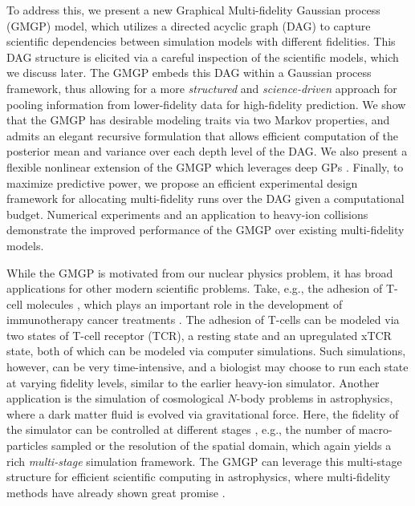 \documentclass[12pt]{article}
\begin{document}
To address this, we present a new Graphical Multi-fidelity Gaussian process (GMGP) model, which utilizes a directed acyclic graph (DAG) to capture scientific dependencies between simulation models with different fidelities. This DAG structure is elicited via a careful inspection of the scientific models, which we discuss later. The GMGP embeds this DAG within a Gaussian process framework, thus allowing for a more \textit{structured} and \textit{science-driven} approach for pooling information from lower-fidelity data for high-fidelity prediction. We show that the GMGP has desirable modeling traits via two Markov properties, and admits an elegant recursive formulation that allows efficient computation of the posterior mean and variance over each depth level of the DAG. {We also present a flexible nonlinear extension of the GMGP which leverages deep GPs \citep{DeepGP}. Finally, to maximize predictive power, we propose an efficient experimental design framework for allocating multi-fidelity runs over the DAG given a computational budget.
Numerical experiments and an application to heavy-ion collisions demonstrate the improved performance of the GMGP over existing multi-fidelity models. }

While the GMGP is motivated from our nuclear physics problem, it has broad applications for other modern scientific problems. Take, e.g., the adhesion of T-cell molecules \citep{sung2020calibration}, which plays an important role in the development of immunotherapy cancer treatments \citep{harjunpaa2019cell}. The adhesion of T-cells can be modeled via two states of T-cell receptor (TCR), a resting state and an upregulated xTCR state, both of which can be modeled via computer simulations. Such simulations, however, can be very time-intensive, and a biologist may choose to run each state at varying fidelity levels, similar to the earlier heavy-ion simulator. Another application is the simulation of cosmological $N$-body problems in astrophysics, where a dark matter fluid is evolved via gravitational force. Here, the fidelity of the simulator can be controlled at different stages \citep{ho2022multifidelity}, e.g., the number of macro-particles sampled or the resolution of the spatial domain, which again yields a rich \textit{multi-stage} simulation framework. The GMGP can leverage this multi-stage structure for efficient scientific computing in astrophysics, where multi-fidelity methods have already shown great promise \citep{ho2022multifidelity}.
\end{document}
